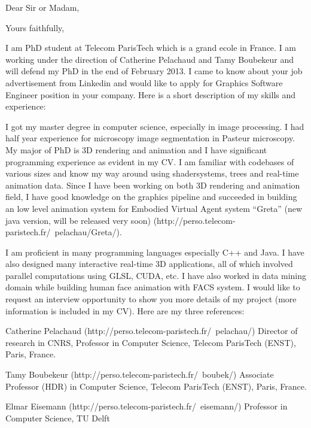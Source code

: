 \date{January 06, 2013}
\opening{Dear Sir or Madam,}
\closing{Yours faithfully,}

\makelettertitle

I am PhD student at Telecom ParisTech which is a grand ecole in France.
I am working under the direction of Catherine Pelachaud  and Tamy Boubekeur and will defend my PhD in the end of February 2013. 
I came to know about your job advertisement from Linkedin and  would like to apply for Graphics Software Engineer position in your company. 
Here is a short description of my skills and experience:

I got my master degree in computer science, especially in image processing.
I had half year experience for microscopy image segmentation in Pasteur microscopy.
My major of PhD is 3D rendering and animation and I have significant programming experience as evident in my CV.  
I am familiar with codebases of various sizes and know my way around using shadersystems, trees and real-time animation data. 
Since I have been working on both 3D rendering and animation field, 
I have good knowledge on the graphics pipeline and  succeeded in building an low level animation system for Embodied Virtual Agent system ``Greta'' (new java version, will be released very soon) (http://perso.telecom-paristech.fr/~pelachau/Greta/).

I am proficient in many programming languages especially  C++ and Java. 
I have also designed many interactive real-time 3D applications, all of which involved parallel computations using GLSL, CUDA, etc. 
I have also worked in data mining domain while building human face animation with FACS system.
I would like to request an interview opportunity to show you more details of my project (more information is included in my CV).
Here are my three references:

Catherine Pelachaud (http://perso.telecom-paristech.fr/~pelachau/)
Director of research in CNRS, Professor in Computer Science, Telecom ParisTech (ENST), Paris, France.

Tamy Boubekeur (http://perso.telecom-paristech.fr/~boubek/)
Associate Professor (HDR) in Computer Science, Telecom ParisTech (ENST), Paris, France.

Elmar Eisemann (http://perso.telecom-paristech.fr/~eisemann/)
Professor in Computer Science, TU Delft

\makeletterclosing
